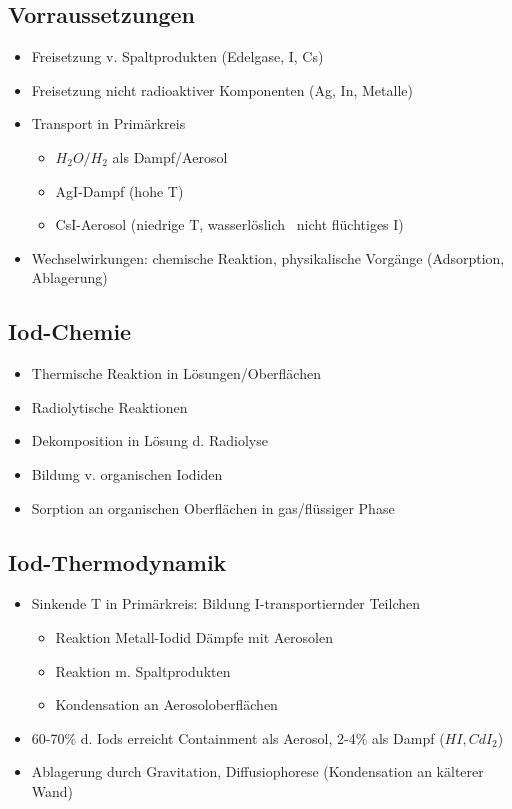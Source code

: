 \documentclass[12pt]{article}
\begin{document}
\subsection{Vorraussetzungen}
\begin{itemize}
  \item Freisetzung v. Spaltprodukten (Edelgase, I, Cs)
  \item Freisetzung nicht radioaktiver Komponenten (Ag, In, Metalle)
  \item Transport in Primärkreis
  \begin{itemize}
    \item \(H_2O/H_2\) als Dampf/Aerosol
    \item AgI-Dampf (hohe T)
    \item CsI-Aerosol (niedrige T, wasserlöslich \textrightarrow\ nicht flüchtiges I)
  \end{itemize}
  \item Wechselwirkungen: chemische Reaktion, physikalische Vorgänge (Adsorption, Ablagerung)
\end{itemize}

\subsection{Iod-Chemie}
\begin{itemize}
  \item Thermische Reaktion in Lösungen/Oberflächen
  \item Radiolytische Reaktionen
  \item Dekomposition in Lösung d. Radiolyse
  \item Bildung v. organischen Iodiden
  \item Sorption an organischen Oberflächen in gas/flüssiger Phase

\end{itemize}

\subsection{Iod-Thermodynamik}
\begin{itemize}
  \item Sinkende T in Primärkreis: Bildung I-transportiernder Teilchen
  \begin{itemize}
    \item Reaktion Metall-Iodid Dämpfe mit Aerosolen
    \item Reaktion m. Spaltprodukten
    \item Kondensation an Aerosoloberflächen
  \end{itemize}
  \item 60-70\% d. Iods erreicht Containment als Aerosol, 2-4\% als Dampf (\(HI, CdI_2\))
  \item Ablagerung durch Gravitation, Diffusiophorese (Kondensation an kälterer Wand)
\end{itemize}
\end{document}
